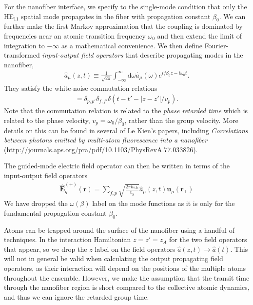 For the nanofiber interface, we specify to the single-mode condition that only the HE$_{11}$ spatial mode propagates in the fiber with propagation constant $\beta_0$.  We can further make the first Markov approximation that the coupling is dominated by frequencies near an atomic transition frequency $\omega_0$ and then extend the limit of integration to $-\infty$ as a mathematical convenience.  We then define Fourier-transformed \emph{input-output field operators} that describe propagating modes in the nanofiber,
	\begin{align}
		\hat{a}_{\mu}(z,t) \equiv \frac{1}{\sqrt{2\pi}} \int_{-\infty}^{\infty} \mathrm{d}\omega \hat{a}_{\mu}(\omega) e^{i f \beta_0 z -i\omega_0 t}.
	\end{align}	
They satisfy the white-noise commutation relations
	\begin{align}
		[\hat{a}_{\mu}(z,t), \hat{a}\dg_{\mu'}(z',t')] = \delta_{p,p'} \delta_{f,f'} \delta(t-t' - |z-z'|/v_p).
	\end{align}	
Note that the commutation relation is related to the \emph{phase retarded time} which is related to the phase velocity, $v_p = \omega_0/\beta_0$, rather than the group velocity.  More details on this can be found in several of Le Kien's papers, including \emph{Correlations between photons emitted by multi-atom fluorescence into a nanofiber} (http://journals.aps.org/pra/pdf/10.1103/PhysRevA.77.033826).

The guided-mode electric field operator can then be written in terms of the input-output field operators
	\begin{align}
		\hat{\mathbf{E}}_g^{(+)}(\mathbf{r}) = \sum_{f ,p} \sqrt{\frac{2 \pi \hbar \omega_0}{v_g}} \hat{a}_{\mu}(z,t) \mathbf{u}_{\mu}(\mathbf{r}_\perp) 
	\end{align}
We have dropped the $\omega(\beta)$ label on the mode functions as it is only for the fundamental propagation constant $\beta_0$.

Atoms can be trapped around the surface of the nanofiber using a handful of techniques.  In the interaction Hamiltonian $z=z' =z_A$ for the two field operators that appear, so we drop the $z$ label on the field operators $\hat{a}(z,t) \rightarrow \hat{a}(t)$.  This will not in general be valid when calculating the output propagating field operators, as their interaction will depend on the positions of the multiple atoms throughout the ensemble.  However, we make the assumption that the transit time through the nanofiber region is short compared to the collective atomic dynamics, and thus we can ignore the retarded group time.  

